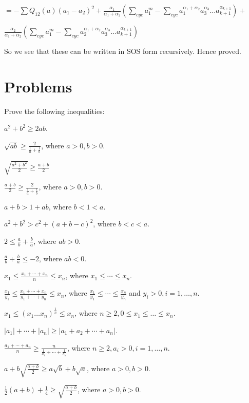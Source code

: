   $= -\sum Q_{12}(a)(a_1 - a_2)^2 + \frac{\alpha_1}{\alpha_1 + \alpha_2}\left(\sum_{cyc} a_1^m - \sum_{cyc}a_1^{\alpha_1 +
    \alpha_2}a_3^{\alpha_3}\ldots a_{k+1}^{\alpha_{k+1}}\right) + $

  $\frac{\alpha_2}{\alpha_1 + \alpha_2}\left(\sum_{cyc} a_1^m - \sum_{cyc}a_2^{\alpha_1 + \alpha_2}a_3^{\alpha_3}\ldots a_{k+1}^{\alpha_{k+1}}\right)$

  So we see that these can be written in SOS form recursively. Hence proved.
\stopproof

\section{Problems}
Prove the following inequalities:

\startitemize[n, 2*broad]
\item $a^2 + b^2 \geq 2ab$.
\item $\sqrt{ab}\geq \frac{2}{\frac{1}{a} + \frac{1}{b}}$, where $a>0, b>0$.
\item $\sqrt{\frac{a^2 + b^2}{2}}\geq \frac{a + b}{2}$
\item $\frac{a + b}{2}\geq \frac{2}{\frac{1}{a} + \frac{1}{b}}$, where $a>0, b>0$.
\item $a + b > 1 + ab$, where $b < 1 < a$.
\item $a^2 + b^2 > c^2 + (a + b - c)^2$, where $b < c< a$.
\item $2\leq \frac{a}{b} + \frac{b}{a}$, where $ab > 0$.
\item $\frac{a}{b} + \frac{b}{a}\leq -2$, where $ab < 0$.
\item $x_1\leq \frac{x_1 + \cdots + x_n}{n}\leq x_n$, where $x_1\leq \cdots\leq x_n$.
\item $\frac{x_1}{y_1}\leq \frac{x_1 + \cdots + x_n}{y_1 + \cdots + y_n}\leq x_n$, where $\frac{x_1}{y_1}\leq\cdots\leq
  \frac{x_n}{y_n}$ and $y_i> 0, i=1, \ldots, n$.
\item $x_1\leq(x_1\ldots x_n)^{\tfrac{1}{n}}\leq x_n$, where $n\geq 2, 0\leq x_1\leq\ldots\leq x_n$.
\item $|a_1| + \cdots + |a_n|\geq |a_1 + a_2 + \cdots + a_n|$.
\item $\frac{a_1 + \cdots + a_n}{n}\geq \frac{n}{\frac{1}{a_1} + \cdots + \frac{1}{a_n}}$, where $n\geq 2, a_i> 0, i=1, \ldots, n$.
\item $a + b\sqrt{\frac{a + b}{2}} \geq a\sqrt{b} + b\sqrt{a}$, where $a > 0, b > 0$.
\item $\frac{1}{2}(a + b) + \frac{1}{4}\geq \sqrt{\frac{a + b}{2}}$, where $a > 0, b > 0$.
